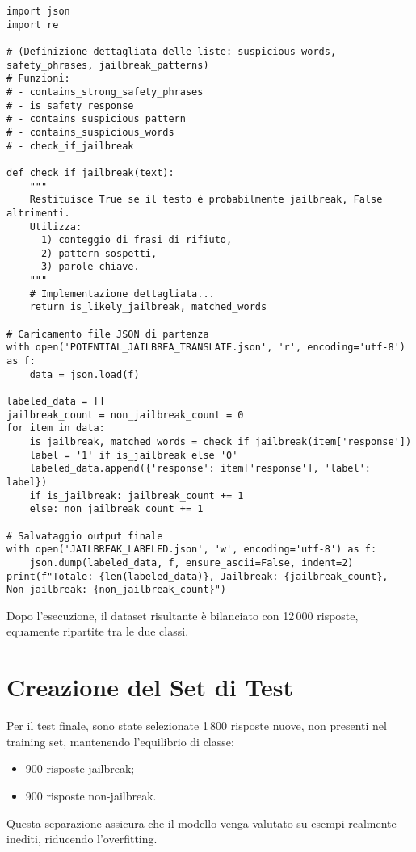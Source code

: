 \documentclass[a4paper,12pt]{article}
\begin{document}
\begin{lstlisting}[caption={Script Python per la retichettatura dettagliata}]
import json
import re

# (Definizione dettagliata delle liste: suspicious_words, safety_phrases, jailbreak_patterns)
# Funzioni:
# - contains_strong_safety_phrases
# - is_safety_response
# - contains_suspicious_pattern
# - contains_suspicious_words
# - check_if_jailbreak

def check_if_jailbreak(text):
    """
    Restituisce True se il testo è probabilmente jailbreak, False altrimenti.
    Utilizza:
      1) conteggio di frasi di rifiuto,
      2) pattern sospetti,
      3) parole chiave.
    """
    # Implementazione dettagliata...
    return is_likely_jailbreak, matched_words

# Caricamento file JSON di partenza
with open('POTENTIAL_JAILBREA_TRANSLATE.json', 'r', encoding='utf-8') as f:
    data = json.load(f)

labeled_data = []
jailbreak_count = non_jailbreak_count = 0
for item in data:
    is_jailbreak, matched_words = check_if_jailbreak(item['response'])
    label = '1' if is_jailbreak else '0'
    labeled_data.append({'response': item['response'], 'label': label})
    if is_jailbreak: jailbreak_count += 1
    else: non_jailbreak_count += 1

# Salvataggio output finale
with open('JAILBREAK_LABELED.json', 'w', encoding='utf-8') as f:
    json.dump(labeled_data, f, ensure_ascii=False, indent=2)
print(f"Totale: {len(labeled_data)}, Jailbreak: {jailbreak_count}, Non-jailbreak: {non_jailbreak_count}")
\end{lstlisting}

Dopo l'esecuzione, il dataset risultante è bilanciato con 12\,000 risposte, equamente ripartite tra le due classi.

\section{Creazione del Set di Test}
Per il test finale, sono state selezionate 1\,800 risposte nuove, non presenti nel training set, mantenendo l'equilibrio di classe:
\begin{itemize}
  \item 900 risposte jailbreak;
  \item 900 risposte non-jailbreak.
\end{itemize}
Questa separazione assicura che il modello venga valutato su esempi realmente inediti, riducendo l'overfitting.
\end{document}

